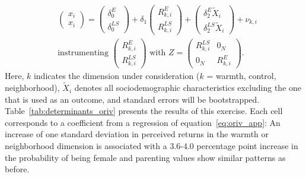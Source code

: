 \documentclass[12pt, a4paper, english]{article}
\begin{document}
\begin{align}\label{eq:oriv_app}
&\left(\begin{array}{c}x_{i}\\x_{i}\end{array}\right) = \left(\begin{array}{c}\delta_0^{E}\\ \delta_0^{LS}\end{array}\right) + \delta_1 \left(\begin{array}{c}R_{k,i}^{E}\\R_{k,i}^{LS}\end{array}\right) + \left(\begin{array}{c}\delta_2^{E}\tilde{X}_{i}\\\delta_2^{LS}\tilde{X}_{i}\end{array}\right) + \nu_{k,i} \\
&\text{instrumenting } \left(\begin{array}{c}R_{k,i}^{E}\\ R_{k,i}^{LS}\end{array}\right) \text{ with } Z=\left(\begin{array}{cc}R_{k,i}^{LS} & 0_{N} \\ 0_{N} & R_{k,i}^{E}\end{array}\right). \nonumber
\end{align}
Here, $k$ indicates the dimension under consideration ($k$ = warmth, control, neighborhood), $\tilde{X}_i$ denotes all sociodemographic characteristics excluding the one that is used as an outcome, and standard errors will be bootstrapped.
Table~\ref{tab:determinants_oriv} presents the results of this exercise. Each cell corresponds to a coefficient from a regression of equation~\eqref{eq:oriv_app}: An increase of one standard deviation in perceived returns in the warmth or neighborhood dimension is associated with a 3.6-4.0 percentage point increase in the probability of being female and parenting values show similar patterns as before.
\end{document}
